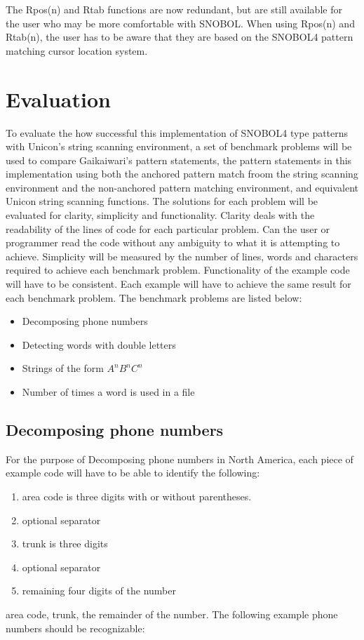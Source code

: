 \documentclass{article}
\begin{document}
The Rpos(n) and Rtab functions are now redundant, but are still available for the user who may be more comfortable with SNOBOL.  When using Rpos(n) and Rtab(n), the user has to be aware that they are based on the SNOBOL4 pattern matching cursor location system.

\section{Evaluation}
To evaluate the how successful this implementation of SNOBOL4 type patterns with Unicon's string scanning environment, a set of benchmark problems will be used to compare Gaikaiwari's pattern statements, the pattern statements in this implementation using both the anchored pattern match froom the string scanning environment and the non-anchored pattern matching environment, and equivalent Unicon string scanning functions.  The solutions for each problem will be evaluated for clarity, simplicity and functionality.  Clarity deals with the readability of the lines of code for each particular problem.  Can the user or programmer read the code without any ambiguity to what it is attempting to achieve.  Simplicity will be measured by the number of lines, words and characters required to achieve each benchmark problem.  Functionality of the example code will have to be consistent.  Each example will have to achieve the same result for each benchmark problem.  The benchmark problems are listed below:

\begin{itemize}
\item Decomposing phone numbers
\item Detecting words with double letters
\item Strings of the form \emph{$A^nB^nC^n$}
\item Number of times a word is used in a file
\end{itemize}

\subsection{Decomposing phone numbers}
For the purpose of Decomposing phone numbers in North America, each piece of example code will have to be able to identify the following:

\begin{enumerate}
\item area code is three digits with or without parentheses.
\item optional separator
\item trunk is three digits
\item optional separator
\item remaining four digits of the number
\end{enumerate}
area code, trunk, the remainder of the number.  The following example phone numbers should be recognizable:
\end{document}
